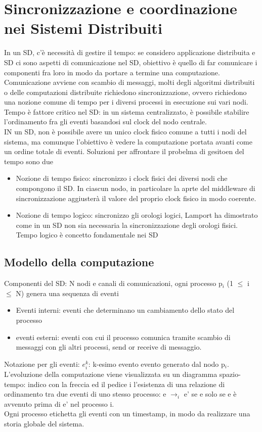 \documentclass[16px]{article}
\begin{document}
\section{Sincronizzazione e coordinazione nei Sistemi Distribuiti}
In un SD, c'è necessità di gestire il tempo: se considero applicazione distribuita e SD ci sono aspetti di comunicazione nel SD, obiettivo è quello di far comunicare i componenti fra loro in modo da portare a termine una computazione. Comunicazione avviene con scambio di messaggi, molti degli algoritmi distribuiti o delle computazioni distribuite richiedono sincronizzazione, ovvero richiedono una nozione comune di tempo per i diversi processi in esecuzione sui vari nodi. Tempo è fattore critico nel SD: in un sistema centralizzato, è possibile stabilire l'ordinamento fra gli eventi basandosi sul clock del nodo centrale.\\ IN un SD, non è possibile avere un unico clock fisico comune a tutti i nodi del sistema, ma comunque l'obiettivo è vedere la computazione portata avanti come un ordine totale di eventi. Soluzioni per affrontare il probelma di gesitoen del tempo sono due
\begin{itemize}
\item Nozione di tempo fisico: sincronizzo i clock fisici dei diversi nodi che compongono il SD. In ciascun nodo, in particolare la aprte del middleware di sincronizzazione aggiusterà il valore del proprio clock fisico in modo coerente.
\item Nozione di tempo logico: sincronizzo gli orologi logici, Lamport ha dimostrato come in un SD non sia necessaria la sincronizzazione degli orologi fisici. Tempo logico è concetto fondamentale nei SD
\end{itemize}
\subsection{Modello della computazione}
Componenti del SD: N nodi e canali di comunicazioni, ogni processo p$_i$ (1 $\leq$ i $\leq$ N) genera una sequenza di eventi
\begin{itemize}
\item Eventi interni: eventi che determinano un cambiamento dello stato del processo
\item eventi esterni: eventi con cui il processo comunica tramite scambio di messaggi con gli altri processi, send or receive di messaggio.
\end{itemize}
Notazione per gli eventi: $e_{i}^k$: k-esimo evento evento generato dal nodo p$_i$. L'evoluzione della computazione viene visualizzata su un diagramma spazio-tempo: indico con la freccia ed il pedice i l'esistenza di una relazione di ordinamento tra due eventi di uno stesso processo: e $\rightarrow_i$ e' se e solo se e è avvenuto prima di e' nel processo i.\\ Ogni processo etichetta gli eventi con un timestamp, in modo da realizzare una storia globale del sistema.
\end{document}
